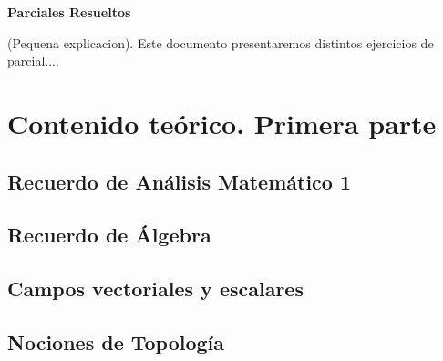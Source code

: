\documentclass[10pt, a4paper]{report}
\begin{document}
    \newpage

    \setcounter{page}{1}
    \begin{center}
        \textbf{ \noindent \textbf{Parciales Resueltos}}
    \end{center}
    \vspace{3cm}
      
    (Pequena explicacion).  Este documento presentaremos distintos ejercicios de parcial....
    \newpage

    \tableofcontents
        \setcounter{page}{1}
    \vfill

    \chapter{Contenido teórico. Primera parte}
        \section{Recuerdo de Análisis Matemático 1}
          
        
         \section{Recuerdo de Álgebra}
           
         
         \section{Campos vectoriales y escalares}
            
                  
        \section{Nociones de Topolog\'ia}
            
      
\end{document}
